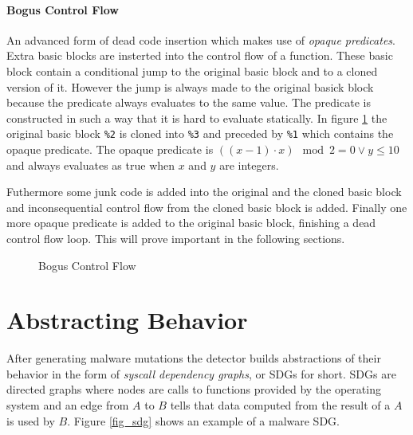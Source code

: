 \paragraph{Bogus Control Flow} An advanced form of dead code insertion which makes use of \emph{opaque predicates}. Extra basic blocks are insterted into the control flow of a function. These basic block contain a conditional jump to the original basic block and to a cloned version of it. However the jump is always made to the original basick block because the predicate always evaluates to the same value. The predicate is constructed in such a way that it is hard to evaluate statically. In figure \ref{fig_bcf} the original basic block \texttt{\%2} is cloned into \texttt{\%3} and preceded by \texttt{\%1} which contains the opaque predicate. The opaque predicate is $((x-1) \cdot x) \mod 2 = 0 \vee y \leq 10$ and always evaluates as true when $x$ and $y$ are integers. 

Futhermore some junk code is added into the original and the cloned basic block and inconsequential control flow from the cloned basic block is added. Finally one more opaque predicate is added to the original basic block, finishing a dead control flow loop. This will prove important in the following sections.

\begin{figure}[H]
    \centering
    \caption{Bogus Control Flow}
    \label{fig_bcf}
\end{figure}

\section{Abstracting Behavior}
\label{s_abstraction}
After generating malware mutations the detector builds abstractions of their behavior in the form of \emph{syscall dependency graphs}, or SDGs for short. SDGs are directed graphs where nodes are calls to functions provided by the operating system and an edge from $A$ to $B$ tells that data computed from the result of a $A$ is used by $B$. Figure \ref{fig_sdg} shows an example of a malware SDG.

